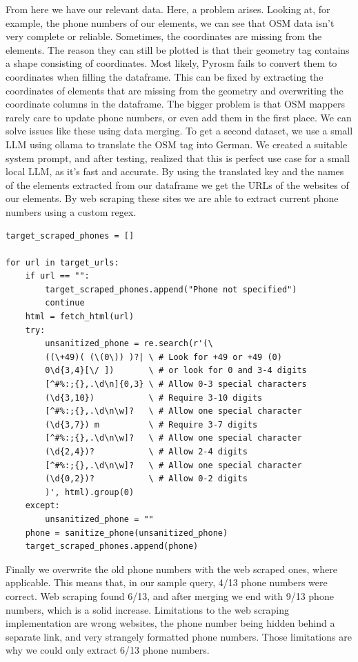 \documentclass[runningheads]{llncs}
\begin{document}
From here we have our relevant data. Here, a problem arises. Looking at, for example, the phone numbers of our elements, we can see that OSM data isn't very complete or reliable. Sometimes, the coordinates are missing from the elements. The reason they can still be plotted is that their geometry tag contains a shape consisting of coordinates. Most likely, Pyrosm fails to convert them to coordinates when filling the dataframe. This can be fixed by extracting the coordinates of elements that are missing from the geometry and overwriting the coordinate columns in the dataframe. The bigger problem is that OSM mappers rarely care to update phone numbers, or even add them in the first place. We can solve issues like these using data merging. To get a second dataset, we use a small LLM using ollama to translate the OSM tag into German. We created a suitable system prompt, and after testing, realized that this is perfect use case for a small local LLM, as it's fast and accurate. By using the translated key and the names of the elements extracted from our dataframe we get the URLs of the websites of our elements. By web scraping these sites we are able to extract current phone numbers using a custom regex.
\begin{lstlisting}
target_scraped_phones = []

for url in target_urls:
    if url == "":
        target_scraped_phones.append("Phone not specified")
        continue
    html = fetch_html(url)
    try:
        unsanitized_phone = re.search(r'(\
        ((\+49)( (\(0\)) )?| \ # Look for +49 or +49 (0)
        0\d{3,4}[\/ ])       \ # or look for 0 and 3-4 digits
        [^#%:;{},.\d\n]{0,3} \ # Allow 0-3 special characters
        (\d{3,10})           \ # Require 3-10 digits
        [^#%:;{},.\d\n\w]?   \ # Allow one special character
        (\d{3,7}) m          \ # Require 3-7 digits
        [^#%:;{},.\d\n\w]?   \ # Allow one special character
        (\d{2,4})?           \ # Allow 2-4 digits
        [^#%:;{},.\d\n\w]?   \ # Allow one special character
        (\d{0,2})?           \ # Allow 0-2 digits
        )', html).group(0)
    except:
        unsanitized_phone = ""
    phone = sanitize_phone(unsanitized_phone)
    target_scraped_phones.append(phone)
\end{lstlisting}
Finally we overwrite the old phone numbers with the web scraped ones, where applicable. This means that, in our sample query, 4/13 phone numbers were correct. Web scraping found 6/13, and after merging we end with 9/13 phone numbers, which is a solid increase. Limitations to the web scraping implementation are wrong websites, the phone number being hidden behind a separate link, and very strangely formatted phone numbers. Those limitations are why we could only extract 6/13 phone numbers.
\end{document}
